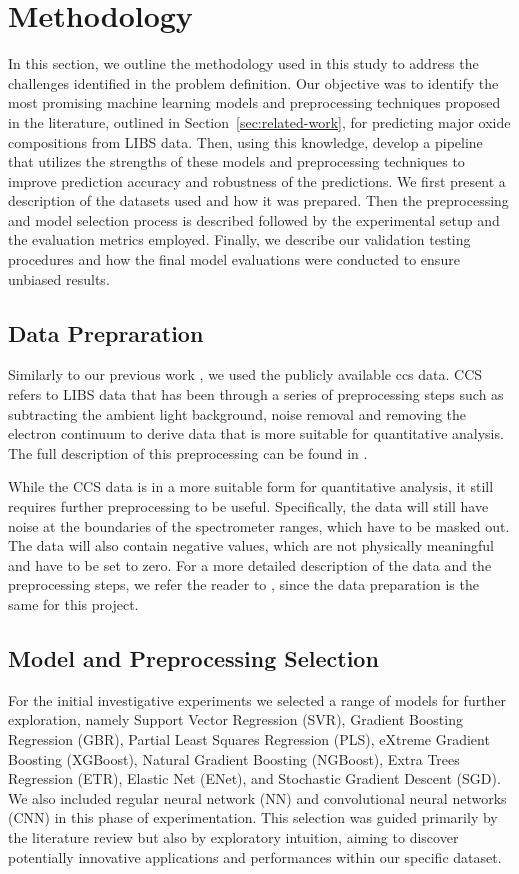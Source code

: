 \section{Methodology}\label{sec:methodology}
In this section, we outline the methodology used in this study to address the challenges identified in the problem definition. Our objective was to identify the most promising machine learning models and preprocessing techniques proposed in the literature, outlined in Section~\ref{sec:related-work}, for predicting major oxide compositions from LIBS data. Then, using this knowledge, develop a pipeline that utilizes the strengths of these models and preprocessing techniques to improve prediction accuracy and robustness of the predictions.
We first present a description of the datasets used and how it was prepared. Then the preprocessing and model selection process is described followed by the experimental setup and the evaluation metrics employed. Finally, we describe our validation testing procedures and how the final model evaluations were conducted to ensure unbiased results.

\subsection{Data Prepraration}
Similarly to our previous work \cite{p9}, we used the publicly available \gls{ccs} data. 
CCS refers to LIBS data that has been through a series of preprocessing steps such as subtracting the ambient light background, noise removal and removing the electron continuum to derive data that is more suitable for quantitative analysis. 
The full description of this preprocessing can be found in \citet{wiensPreFlight3}.

While the CCS data is in a more suitable form for quantitative analysis, it still requires further preprocessing to be useful. Specifically, the data will still have noise at the boundaries of the spectrometer ranges, which have to be masked out. The data will also contain negative values, which are not physically meaningful and have to be set to zero. 
For a more detailed description of the data and the preprocessing steps, we refer the reader to \citet{p9}, since the data preparation is the same for this project.

\subsection{Model and Preprocessing Selection}
For the initial investigative experiments we selected a range of models for further exploration, namely Support Vector Regression (SVR), Gradient Boosting Regression (GBR), Partial Least Squares Regression (PLS), eXtreme Gradient Boosting (XGBoost), Natural Gradient Boosting (NGBoost), Extra Trees Regression (ETR), Elastic Net (ENet), and Stochastic Gradient Descent (SGD). 
We also included regular neural network (NN) and convolutional neural networks (CNN) in this phase of experimentation. 
This selection was guided primarily by the literature review but also by exploratory intuition,
aiming to discover potentially innovative applications and performances within our specific dataset.

